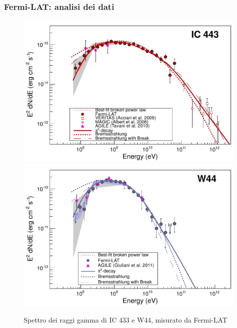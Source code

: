 \documentclass[10pt]{beamer}
\begin{document}
\begin{frame}
  \frametitle{Fermi-LAT: analisi dei dati}
  \begin{figure}
    \centering
    \includegraphics[width=0.5\columnwidth]{1231160fig2a}
    \includegraphics[width=0.5\columnwidth]{1231160fig2b}
    \caption{Spettro dei raggi gamma di IC 433 e W44, misurato da Fermi-LAT}
  \end{figure}
\end{frame}
\end{document}
